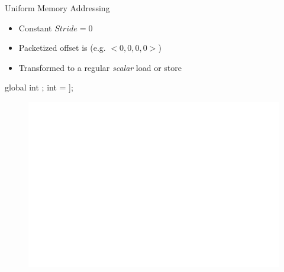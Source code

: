 
\begin{frame}[fragile]{Uniform Memory Addressing}

\begin{itemize}
    \item Constant $Stride = 0$
    \item Packetized offset is  (e.g. $<0, 0, 0, 0>$)
    \item Transformed to a regular \emph{scalar} load or store
\end{itemize}

\begin{minipage}[t]{0.40\linewidth}
    \vspace{0.1ex}
    \begin{codebox}[commandchars=\\\[\]]

global int \uniform[*src];
int \uniform[x] = \uniform[src]\idx[\uniform[0]];






    \end{codebox}
\end{minipage}
\begin{minipage}[t]{0.49\linewidth}
    \begin{figure}
        \includegraphics[scale=0.5]{images/uniform-access.pdf}
    \end{figure}
\end{minipage}

\end{frame}

